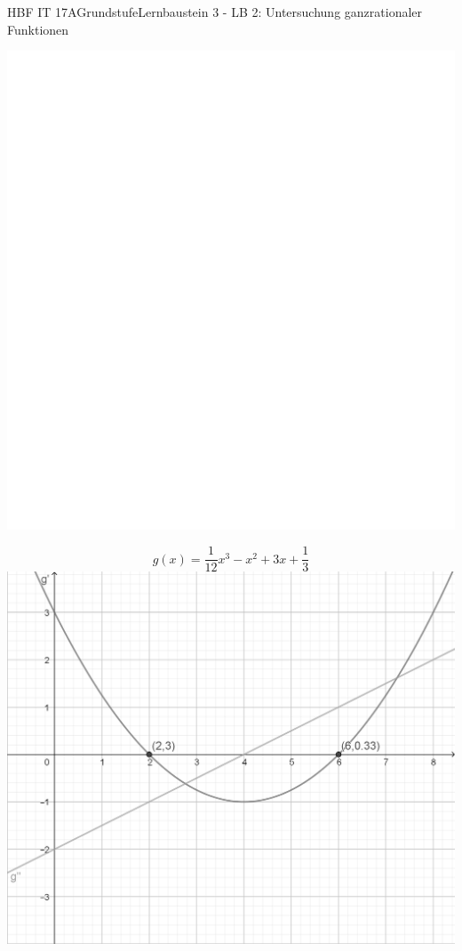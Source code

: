 \documentclass[oneside,openany,headings=optiontotoc,11pt,numbers=noenddot]{scrreprt}
\begin{document}
\begin{worksheet}{HBF IT 17A}{Grundstufe}{Lernbaustein 3 - LB 2: Untersuchung ganzrationaler Funktionen}
\begin{framed}
		\end{framed}
		\begin{framed}
			\includegraphics[scale=0.5]{../empty.jpg}
		\end{framed}
		\newpage
		\setcounter{page}{1}
		\begin{framed}
			\noindent
			\[g(x) = \frac{1}{12}x^3 - x^2 + 3x + \frac{1}{3}\]
			\includegraphics[scale=0.6]{Bilder/HOPTIP_g'g''.png}

\end{framed}
\end{worksheet}
\end{document}
